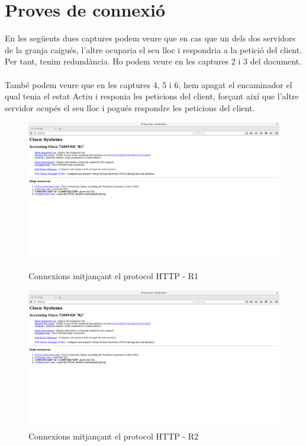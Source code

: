 \documentclass[10pt]{article}
\begin{document}
\section{Proves de connexió}
En les següents dues captures podem veure que en cas que un dels dos servidors de la granja caigués, l'altre ocuparia el seu lloc i respondria a la petició del client. Per tant, tenim redundància. Ho podem veure en les captures 2 i 3 del document.
\\\\
També podem veure que en les captures 4, 5 i 6, hem apagat el encaminador el qual tenia el estat Actiu i responia les peticions del client, forçant així que l'altre servidor ocupés el seu lloc i pogués respondre les peticions del client.
\begin{figure}
	\includegraphics[scale=0.24]{Images/R1.png}
	\caption{Connexions mitjançant el protocol HTTP - R1}
	\includegraphics[scale=0.24]{Images/R2.png}
	\caption{Connexions mitjançant el protocol HTTP - R2}
\end{figure}
\end{document}
